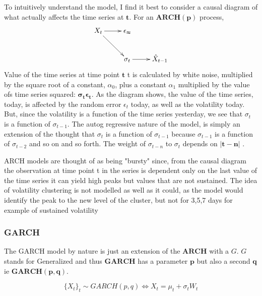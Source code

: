 To intuitively understand the model, I find it best to consider a causal diagram of what actually affects the time series at $\mathbf{t}$. For an $\mathbf{ARCH(p)}$ process, 
$$
\xymatrix{
{X_t} \ar[dr] \ar[r] &\mathbb{\epsilon_t} \\
& \sigma_t \ar[r] & \hat{X}_{t-1}}
$$
Value of the time series at time point $\mathbf{t}$ t is calculated by white noise, multiplied by the square root of a constant, $\alpha_0$, plus a constant $\alpha_1$ multiplied by the value ofs time series squared: $\mathbf{\sigma_t\epsilon_t}$. As the diagram shows, the value of the time series, today, is affected by the random error $\epsilon_t$ today, as well as the volatility today. But, since the volatility is a function of the time series yesterday, we see that $\sigma_t$ is a function of $\sigma_{t-1}$. The autog regressive nature of the model, is simply an extension of the thought that $\sigma_t$ is a function of $\sigma_{t-1}$ because $\sigma_{t-1}$ is a function of $\sigma_{t-2}$ and so on and so forth. The weight of $\sigma_{t-n}$ to $\sigma_{t}$ depends on $\mathbf{|t-n|}$  \cite{GARCHYoutube}.

ARCH models are thought of as being "bursty" since, from the causal diagram the observation at time point t in the series is dependent only on the last value of the time series it can yield high peaks but values that are not sustained. The idea of volatility clustering is not modelled as well as it could, as the model would identify the peak to the new level of the cluster, but not for 3,5,7 days for example of sustained volatility \cite{GARCHYoutube}

\subsubsection{GARCH}

The GARCH model by nature is just an extension of the $\mathbf{ARCH}$ with a $G$. $G$ stands for Generalized and thus $\mathbf{GARCH}$ has a parameter $\mathbf{p}$ but also a second $\mathbf{q}$ ie $\mathbf{GARCH(p,q)}$. 

$$\{X_t\}_t \sim GARCH(p,q) \iff X_t = \mu_t+\sigma_tW_t$$

